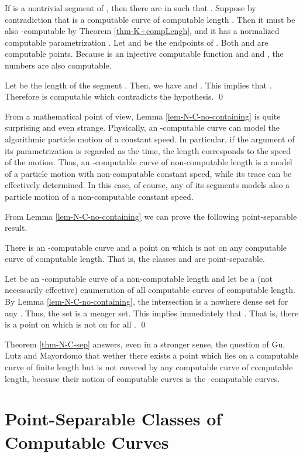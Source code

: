 \documentclass{LMCS}
\theoremstyle{plain}
\begin{document}
If  is a nontrivial segment of , then there are  in  such that . Suppose by contradiction that  is a computable curve of computable length . Then it must be also -computable by Theorem \ref{thm-K+compLengh}, and it has a normalized computable parametrization . Let  and  be the endpoints of . Both  and  are computable points. Because  is an injective computable function and  and , the numbers  are also computable.

Let  be the length of the segment . Then, we have  and . This implies that . Therefore  is computable which contradicts the hypothesis.
\qed

From a mathematical point of view, Lemma \ref{lem-N-C-no-containing} is quite surprising and even strange. Physically, an -computable curve  can model the algorithmic particle motion of a constant speed. In particular, if the argument  of its parametrization  is regarded as the time, the length  corresponds to the speed of the motion. Thus, an -computable curve of non-computable length is a model of a particle motion with non-computable constant speed, while its trace can be effectively determined. In this case, of course, any of its segments models also a particle motion of a non-computable constant speed.

From Lemma \ref{lem-N-C-no-containing} we can prove the following point-separable result.

\begin{thm}\label{thm-N-C-sep}
There is an -computable curve  and a point on  which is not on any computable curve of computable length. That is, the classes  and  are point-separable.
\end{thm}

\proof
Let  be an -computable curve of a non-computable length and let  be a (not necessarily effective) enumeration of all computable curves of computable length. By Lemma \ref{lem-N-C-no-containing}, the intersection  is a nowhere dense set for any . Thus, the set  is a meager set. This implies immediately that . That is, there is a point on  which is not on  for all .
\qed

Theorem \ref{thm-N-C-sep} answers, even in a stronger sense, the question of Gu, Lutz and Mayordomo \cite{GLM11} that wether there exists a point which lies on a computable curve of finite length but is not covered by any computable curve of computable length, because their notion of computable curves
is the -computable curves.


\section{Point-Separable Classes of Computable Curves}\label{sec-main}
\end{document}
